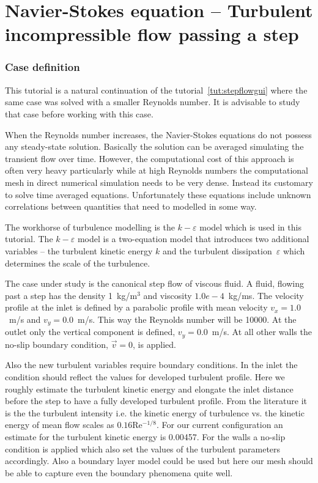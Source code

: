 \chapter{Navier-Stokes equation -- Turbulent incompressible flow passing a step}
\label{tut:stepflowke}




\subsection*{Case definition}

This tutorial is a natural continuation of the tutorial~\ref{tut:stepflowgui}
where the same case was solved with a smaller Reynolds number. It is advisable 
to study that case before working with this case. 

When the Reynolds number increases, the 
Navier-Stokes equations do not possess any steady-state 
solution. Basically the solution can be averaged simulating the transient 
flow over time. However, the computational cost of this approach is often very 
heavy particularly while at high Reynolds numbers the computational mesh
in direct numerical simulation needs to be very dense. Instead its customary
to solve time averaged equations. Unfortunately these equations include 
unknown correlations between quantities that need to modelled in some way.

The workhorse of turbulence modelling is the $k-\varepsilon$ model which 
is used in this tutorial. The $k-\varepsilon$ model is a two-equation model
that introduces two additional variables -- the turbulent kinetic energy $k$ and the 
turbulent dissipation~$\varepsilon$
which determines the scale of the turbulence.

The case under study is the canonical step flow of viscous fluid. 
A fluid, flowing past a step has the density
1~kg/m$^3$ and viscosity $1.0e-4$~kg/ms. The velocity profile at the inlet is
defined by a parabolic profile with mean velocity 
$v_x=1.0$~m/s and $v_y=0.0$~m/s. 
This way the Reynolds number will be 10000.
At the outlet only 
the vertical component is defined, $v_y=0.0$~m/s. At all other
walls the no-slip boundary condition, $\vec{v}=0$, is applied. 

Also the new turbulent variables require boundary conditions. 
In the inlet the condition should reflect the values for developed turbulent
profile. Here we roughly estimate the turbulent kinetic energy and 
elongate the inlet distance before the step 
to have a fully developed turbulent profile. 
From the literature it is the the turbulent intensity i.e. the 
kinetic energy of turbulence vs. the kinetic energy of mean flow 
scales as $0.16$Re$^{-1/8}$. For our current configuration an estimate for the 
turbulent kinetic energy is 0.00457. 
For the walls a no-slip condition is applied which also set the values of the
turbulent parameters accordingly. Also a boundary layer model could be used but here
our mesh should be able to capture even the boundary phenomena quite well. 

